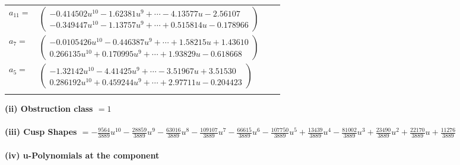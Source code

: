 \documentclass[1p]{elsarticle_modified}
\theoremstyle{definition}
\begin{document}
\begin{tabular}{m{7pt} m{180pt} m{7pt} m{180pt} }
\flushright $a_{11}=$&$\begin{pmatrix}-0.414502 u^{10}-1.62381 u^{9}+\cdots-4.13577 u-2.56107\\-0.349447 u^{10}-1.13757 u^{9}+\cdots+0.515814 u-0.178966\end{pmatrix}$ \\
\flushright $a_{7}=$&$\begin{pmatrix}-0.0105426 u^{10}-0.446387 u^{9}+\cdots+1.58215 u+1.43610\\0.266135 u^{10}+0.170995 u^{9}+\cdots+1.93829 u-0.618668\end{pmatrix}$ \\
\flushright $a_{5}=$&$\begin{pmatrix}-1.32142 u^{10}-4.41425 u^{9}+\cdots-3.51967 u+3.51530\\0.286192 u^{10}+0.459244 u^{9}+\cdots+2.97711 u-0.204423\end{pmatrix}$\\&\end{tabular}
\flushleft \textbf{(ii) Obstruction class $= 1$}\\~\\
\flushleft \textbf{(iii) Cusp Shapes $= -\frac{9564}{3889} u^{10}-\frac{28859}{3889} u^9-\frac{63016}{3889} u^8-\frac{109107}{3889} u^7-\frac{66615}{3889} u^6-\frac{107750}{3889} u^5+\frac{13439}{3889} u^4-\frac{81002}{3889} u^3+\frac{23490}{3889} u^2+\frac{22170}{3889} u+\frac{11276}{3889}$}\\~\\
\newpage\renewcommand{\arraystretch}{1}
\flushleft \textbf{(iv) u-Polynomials at the component}\newline \\
\end{document}
